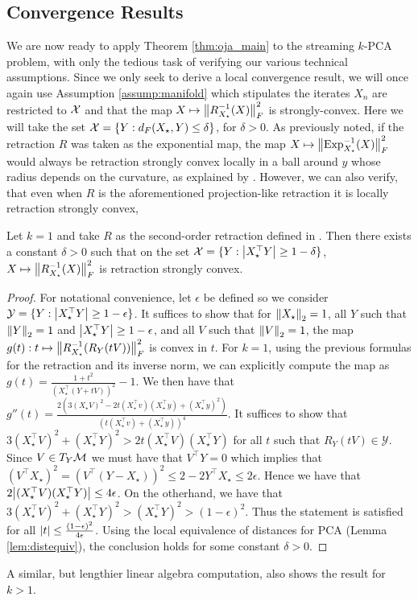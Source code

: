 \subsection{Convergence Results}

We are now ready to apply Theorem \ref{thm:oja_main} to the streaming $k$-PCA problem, with only the tedious task of verifying our various technical assumptions. Since we only seek to derive a local convergence result, we will once again use Assumption \ref{assump:manifold} which stipulates the iterates $X_n$ are restricted to $\mathcal{X}$ and that the map $X\mapsto\norm{R_{X_\star}^{-1}(X)}_F^2$ is strongly-convex. Here we will take the set $\mathcal{X}=\{Y : d_F(X_\star, Y)\leq \delta \}$, for $\delta>0$.  As previously noted, if the retraction $R$ was taken as the exponential map, the map $X\mapsto \norm{\Exp_{X_\star}^{-1}(X)}_F^2$ would always be retraction strongly convex locally in a ball around $y$ whose radius depends on the curvature, as explained by \citet{Afs11}. However,
we can also verify, that even when $R$ is the aforementioned projection-like retraction it is locally retraction strongly convex,
\begin{remark} \label{rmk:strongcvxpca}
 Let $k=1$ and take $R$ as the second-order retraction defined in . Then there exists a constant $\delta>0$ such that on the set
 $\mathcal{X} = \{Y : \abs{X_\star^\top Y} \geq 1-\delta \}$, $X\mapsto \norm{R_{X_\star}^{-1}(X)}_F^2$ is retraction strongly convex.
\end{remark}
\begin{proof}
 For notational convenience, let $\epsilon$ be defined so we consider $\mathcal{Y} = \{ Y : \abs{X_\star^\top Y} \geq 1-\epsilon \}$. It suffices to show that for $\norm{X_\star}_2=1$, all $Y$ such that $\norm{Y}_2=1$ and $\abs{X_\star^\top Y} \geq 1-\epsilon$, and all $V$ such that $\norm{V}_2=1$, the map $g(t) : t \mapsto \norm{R_{X_\star}^{-1}(R_{Y}(t V))}_F^2$ is convex in $t$. For $k=1$, using the previous formulas for the retraction and its inverse norm, we can explicitly compute the map as $g(t) = \frac{1+t^2}{(X_\star^\top(Y+tV))^2}-1$. We then have that $g''(t) = \frac{2 (3 (X_\star V)^2-2t (X_\star^\top v)(X_\star^\top y)+ (X_\star^\top y)^2)}{(t (X_\star^\top v) +(X_\star^\top y))^4}$. It suffices to show that $3 (X_\star^\top V)^2+ (X_\star^\top Y)^2 > 2t (X_\star^\top V)(X_\star^\top Y)$ for all $t$ such that $R_{Y}(t V) \in \mathcal{Y}$.
 Since $V \in T_{Y}\mathcal{M}$ we must have that $V^\top Y = 0$ which implies that $(V^\top X_\star)^2 = (V^\top (Y-X_\star))^2 \leq 2-2Y^\top X_{\star} \leq 2 \epsilon$. Hence we have that $2\abs{(X_\star^\top V)(X_\star^\top Y)} \leq 4\epsilon$. On the otherhand,
 we have that $3 (X_\star^\top V)^2+ (X_\star^\top Y)^2 > (X_\star^\top Y)^2 > (1-\epsilon)^2$. Thus the statement is satisfied for all $\abs{t} \leq \frac{(1-\epsilon)^2}{4\epsilon}$. Using the local equivalence of distances for PCA (Lemma \ref{lem:distequiv}), the conclusion holds for some constant $\delta>0$.
\end{proof}
A similar, but lengthier linear algebra computation, also shows the result for $k > 1$.

